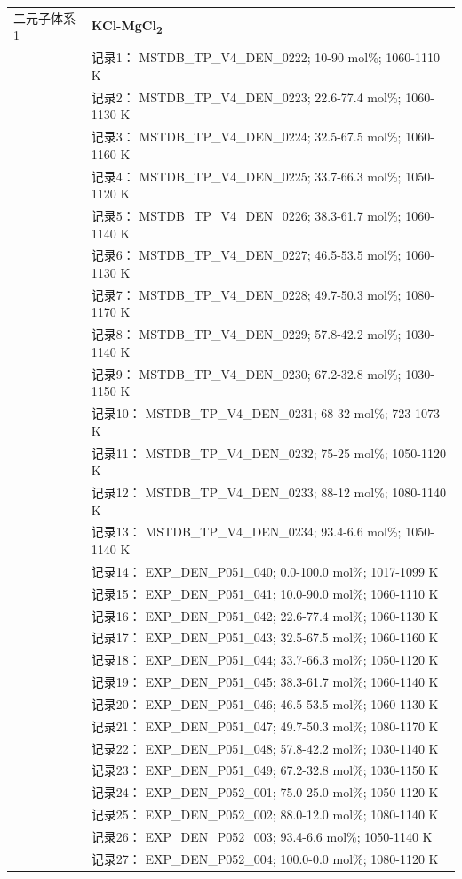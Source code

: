 \documentclass[12pt]{article}
\begin{document}
{\begin{longtable}[]{@{}
  >{\raggedright\arraybackslash}p{}
  >{\raggedright\arraybackslash}p{}@{}}
二元子体系 1  & \textbf{KCl-MgCl\textsubscript{2}} \\
 & 记录1： MSTDB\_TP\_V4\_DEN\_0222; 10-90 mol\%; 1060-1110 K \\
 & 记录2： MSTDB\_TP\_V4\_DEN\_0223; 22.6-77.4 mol\%; 1060-1130 K \\
 & 记录3： MSTDB\_TP\_V4\_DEN\_0224; 32.5-67.5 mol\%; 1060-1160 K \\
 & 记录4： MSTDB\_TP\_V4\_DEN\_0225; 33.7-66.3 mol\%; 1050-1120 K \\
 & 记录5： MSTDB\_TP\_V4\_DEN\_0226; 38.3-61.7 mol\%; 1060-1140 K \\
 & 记录6： MSTDB\_TP\_V4\_DEN\_0227; 46.5-53.5 mol\%; 1060-1130 K \\
 & 记录7： MSTDB\_TP\_V4\_DEN\_0228; 49.7-50.3 mol\%; 1080-1170 K \\
 & 记录8： MSTDB\_TP\_V4\_DEN\_0229; 57.8-42.2 mol\%; 1030-1140 K \\
 & 记录9： MSTDB\_TP\_V4\_DEN\_0230; 67.2-32.8 mol\%; 1030-1150 K \\
 & 记录10： MSTDB\_TP\_V4\_DEN\_0231; 68-32 mol\%; 723-1073 K \\
 & 记录11： MSTDB\_TP\_V4\_DEN\_0232; 75-25 mol\%; 1050-1120 K \\
 & 记录12： MSTDB\_TP\_V4\_DEN\_0233; 88-12 mol\%; 1080-1140 K \\
 & 记录13： MSTDB\_TP\_V4\_DEN\_0234; 93.4-6.6 mol\%; 1050-1140 K \\
 & 记录14： EXP\_DEN\_P051\_040; 0.0-100.0 mol\%; 1017-1099 K \\
 & 记录15： EXP\_DEN\_P051\_041; 10.0-90.0 mol\%; 1060-1110 K \\
 & 记录16： EXP\_DEN\_P051\_042; 22.6-77.4 mol\%; 1060-1130 K \\
 & 记录17： EXP\_DEN\_P051\_043; 32.5-67.5 mol\%; 1060-1160 K \\
 & 记录18： EXP\_DEN\_P051\_044; 33.7-66.3 mol\%; 1050-1120 K \\
 & 记录19： EXP\_DEN\_P051\_045; 38.3-61.7 mol\%; 1060-1140 K \\
 & 记录20： EXP\_DEN\_P051\_046; 46.5-53.5 mol\%; 1060-1130 K \\
 & 记录21： EXP\_DEN\_P051\_047; 49.7-50.3 mol\%; 1080-1170 K \\
 & 记录22： EXP\_DEN\_P051\_048; 57.8-42.2 mol\%; 1030-1140 K \\
 & 记录23： EXP\_DEN\_P051\_049; 67.2-32.8 mol\%; 1030-1150 K \\
 & 记录24： EXP\_DEN\_P052\_001; 75.0-25.0 mol\%; 1050-1120 K \\
 & 记录25： EXP\_DEN\_P052\_002; 88.0-12.0 mol\%; 1080-1140 K \\
 & 记录26： EXP\_DEN\_P052\_003; 93.4-6.6 mol\%; 1050-1140 K \\
 & 记录27： EXP\_DEN\_P052\_004; 100.0-0.0 mol\%; 1080-1120 K  \\


\end{longtable}}
\end{document}
